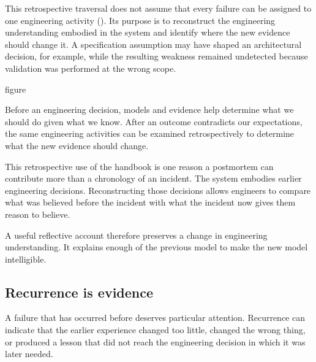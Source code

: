 This retrospective traversal does not assume that every failure can be assigned to one engineering
activity (\citet{fig-prospective-retrospective}). Its purpose is to reconstruct the engineering
understanding embodied in the system and identify where the new evidence should change it. A
specification assumption may have shaped an architectural decision, for example, while the
resulting weakness remained undetected because validation was performed at the wrong scope.

\begin{bookbox}{figure}{} %
\pandocbounded{}

Before an engineering decision, models and evidence help determine what we should do given what
we know. After an outcome contradicts our expectations, the same engineering activities can be
examined retrospectively to determine what the new evidence should change.
\end{bookbox}

This retrospective use of the handbook is one reason a postmortem can contribute more than a
chronology of an incident. The system embodies earlier engineering decisions. Reconstructing those
decisions allows engineers to compare what was believed before the incident with what the incident
now gives them reason to believe.

A useful reflective account therefore preserves a change in engineering understanding. It explains
enough of the previous model to make the new model intelligible.

\subsection{Recurrence is evidence}\label{sec-recurrence}

A failure that has occurred before deserves particular attention. Recurrence can indicate that the
earlier experience changed too little, changed the wrong thing, or produced a lesson that did not
reach the engineering decision in which it was later needed.

